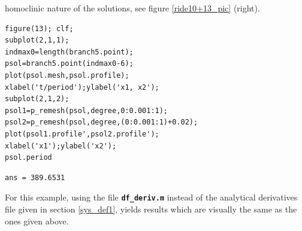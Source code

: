 \documentclass[10pt]{scrartcl}
\newcommand{\file}[1]{\textbf{\texttt{#1}}}
\begin{document}
homoclinic nature of the solutions, see figure \ref{ride10+13_pic} (right).
\begin{lstlisting}
figure(13); clf;
subplot(2,1,1);
indmax0=length(branch5.point);
psol=branch5.point(indmax0-6);
plot(psol.mesh,psol.profile);
xlabel('t/period');ylabel('x1, x2');
subplot(2,1,2);
psol1=p_remesh(psol,degree,0:0.001:1);
psol2=p_remesh(psol,degree,(0:0.001:1)+0.02);
plot(psol1.profile',psol2.profile');
xlabel('x1');ylabel('x2');
psol.period  
\end{lstlisting}
{\small
\begin{verbatim}
ans = 389.6531
\end{verbatim}}
For this example, using the file \file{df\_deriv.m} instead of the 
analytical derivatives file given in section \ref{sys_def1},
yields results which are visually the same as the ones given
above.
\end{document}
